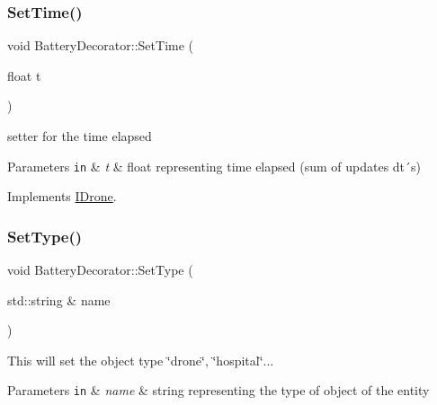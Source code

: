 \mbox{\label{classBatteryDecorator_abf7e2a2b4634330de27e7072236ffc5f}} 
\subsubsection{\texorpdfstring{Set\+Time()}{SetTime()}}
{\footnotesize\ttfamily void Battery\+Decorator\+::\+Set\+Time (\begin{DoxyParamCaption}\item[{float}]{t }\end{DoxyParamCaption})\hspace{0.3cm}{\ttfamily [virtual]}}



setter for the time elapsed 


\begin{DoxyParams}[1]{Parameters}
\mbox{\tt in}  & {\em t} & float representing time elapsed (sum of updates dt´s) \\
\hline
\end{DoxyParams}


Implements \hyperlink{classIDrone_a0ca36885fd79fbf2efa3909771218d56}{I\+Drone}.

\mbox{\label{classBatteryDecorator_a815d1943eef8e5f147158a043fe02825}} 
\subsubsection{\texorpdfstring{Set\+Type()}{SetType()}}
{\footnotesize\ttfamily void Battery\+Decorator\+::\+Set\+Type (\begin{DoxyParamCaption}\item[{std\+::string \&}]{name }\end{DoxyParamCaption})\hspace{0.3cm}{\ttfamily [virtual]}}



This will set the object type \char`\"{}drone\char`\"{}, \char`\"{}hospital\char`\"{}... 


\begin{DoxyParams}[1]{Parameters}
\mbox{\tt in}  & {\em name} & string representing the type of object of the entity \\
\hline
\end{DoxyParams}


